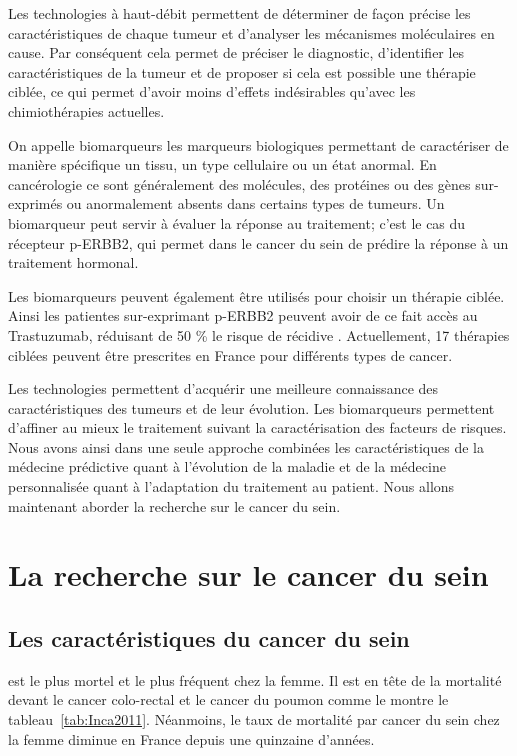 			Les technologies à haut-débit permettent de déterminer de façon précise les caractéristiques de chaque tumeur et d'analyser les mécanismes moléculaires en cause.
			Par conséquent cela permet de préciser le diagnostic, d'identifier les caractéristiques de la tumeur et de proposer si cela est possible une thérapie ciblée, ce qui permet d'avoir moins d'effets indésirables qu'avec les chimiothérapies actuelles.

			On appelle biomarqueurs les marqueurs biologiques permettant de caractériser de manière spécifique un tissu, un type cellulaire ou un état anormal.
			En cancérologie ce sont généralement des molécules, des protéines ou des gènes sur-exprimés ou anormalement absents dans certains types de tumeurs.
			Un biomarqueur peut servir à évaluer la réponse au traitement; c'est le cas du récepteur \acs{p-ERBB2}, qui permet dans le cancer du sein de prédire la réponse à un traitement hormonal.

			Les biomarqueurs peuvent également être utilisés pour choisir un thérapie ciblée.
			Ainsi les patientes sur-exprimant \acs{p-ERBB2} peuvent avoir de ce fait accès au Trastuzumab, réduisant de 50 \% le risque de récidive \citep{Hudis2007}.
			Actuellement, 17 thérapies ciblées peuvent être prescrites en France pour différents types de cancer.

			Les technologies permettent d'acquérir une meilleure connaissance des caractéristiques des tumeurs et de leur évolution.
			Les biomarqueurs permettent d'affiner au mieux le traitement suivant la caractérisation des facteurs de risques.
			Nous avons ainsi dans une seule approche combinées les caractéristiques de la médecine prédictive quant à l'évolution de la maladie et de la médecine personnalisée quant à l'adaptation du traitement au patient.
			Nous allons maintenant aborder la recherche sur le cancer du sein.

	\section{\textcolor{myred}{La recherche sur le cancer du sein}}\label{Sec:RechercheBC}

		\subsection{\textcolor{myred}{Les caractéristiques du cancer du sein}}
			 est le plus mortel et le plus fréquent chez la femme.
			Il est en tête de la mortalité devant le cancer colo-rectal et le cancer du poumon comme le montre le tableau~\ref{tab:Inca2011}.
			Néanmoins, le taux de mortalité par cancer du sein chez la femme diminue en France depuis une quinzaine d'années.

